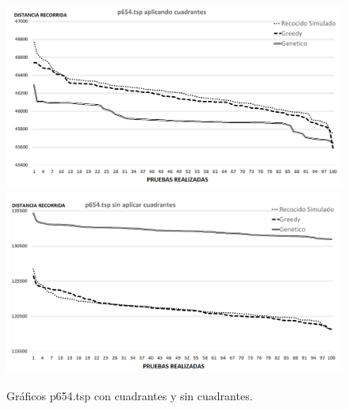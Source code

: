 \begin{figure}[hbtp]
    \centering
        \includegraphics[width=1\textwidth]{PruebasResultados/Experimentos_Graficos_Con/p654.png}
        \includegraphics[width=1\textwidth]{PruebasResultados/Experimentos_Graficos_Sin/p654.png}
        \caption{Gráficos p654.tsp con cuadrantes y sin cuadrantes.}
        \label{fig:p654_grafica.png}
\end{figure}
\newpage

